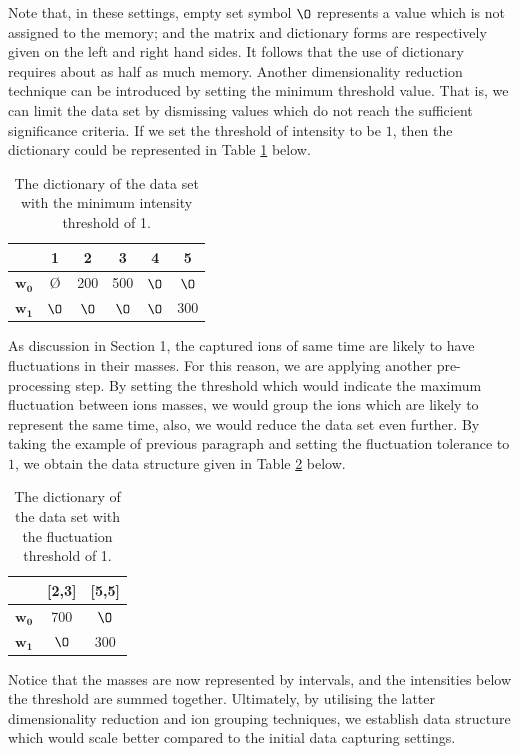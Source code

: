 \documentclass{mprop}
\begin{document}
Note that, in these settings, empty set symbol $\O$ represents a value which is not assigned to the memory; and the matrix and dictionary forms are respectively given on the left and right hand sides. It follows that the use of dictionary requires about as half as much memory. Another dimensionality reduction technique can be introduced by setting the minimum threshold value. That is, we can limit the data set by dismissing values which do not reach the sufficient significance criteria. If we set the threshold of intensity to be $1$, then the dictionary could be represented in Table \ref{tab:d_threshhold} below.
\begin{table}[H]
\begin{center}
\begin{tabular}{|c||c|c|c|c|c|}
\hline
&1&2&3&4&5\\
\hline
$\mathbf{w_0}$&\O&200&500&$\O$&$\O$\\
$\mathbf{w_1}$&$\O$&$\O$&$\O$&$\O$&300\\
\hline
\end{tabular}
\end{center}
\caption{The dictionary of the data set with the minimum intensity threshold of 1.}
\label{tab:d_threshhold}
\end{table}

\par As discussion in Section 1, the captured ions of same time are likely to have fluctuations in their masses. For this reason, we are applying another pre-processing step. By setting the threshold which would indicate the maximum fluctuation between ions masses, we would group the ions which are likely to represent the same time, also, we would reduce the data set even further. By taking the example of previous paragraph and setting the fluctuation tolerance to $1$, we obtain the data structure given in Table \ref{tab:d_f_threshhold} below.
\begin{table}[H]
\begin{center}
\begin{tabular}{|c||c|c|}
\hline
&[2,3]&[5,5]\\
\hline
$\mathbf{w_0}$&700&$\O$\\
$\mathbf{w_1}$&$\O$&300\\
\hline
\end{tabular}
\end{center}
\caption{The dictionary of the data set with the fluctuation threshold of 1.}
\label{tab:d_f_threshhold}
\end{table}
Notice that the masses are now represented by intervals, and the intensities below the threshold are summed together. Ultimately, by utilising the latter dimensionality reduction and ion grouping techniques, we establish data structure which would scale better compared to the initial data capturing settings.
\end{document}
